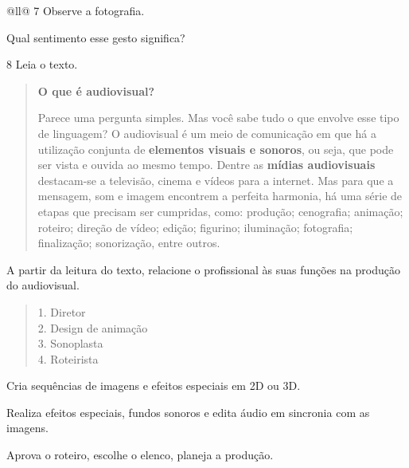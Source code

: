 \begin{itemize}
\begin{itemize}
\begin{escolha}[]{@{}ll@{}}
\num{7} Observe a fotografia.


Qual sentimento esse gesto significa?


\num{8} Leia o texto.

\begin{quote}
\textbf{O que é audiovisual?}

Parece uma pergunta simples. Mas você sabe tudo o que envolve esse tipo
de linguagem? O audiovisual é um meio de comunicação em que há a
utilização conjunta de \textbf{elementos visuais e sonoros}, ou seja,
que pode ser vista e ouvida ao mesmo tempo. Dentre as \textbf{mídias
audiovisuais} destacam-se a
televisão, cinema e vídeos
para a internet. Mas para que a mensagem, som e imagem encontrem a
perfeita harmonia, há uma série de etapas que precisam ser cumpridas,
como: produção; cenografia;
animação; roteiro;
direção de vídeo; edição; figurino; iluminação; fotografia; finalização;
sonorização, entre outros.

\end{quote}

A partir da leitura do texto, relacione o profissional às suas funções
na produção do audiovisual.

\begin{quote}
1. Diretor\\
2. Design de animação\\
3.  Sonoplasta\\
4. Roteirista
\end{quote}

\begin{boxlist}
\item Cria sequências de imagens e efeitos especiais em 2D ou 3D. 

\item Realiza efeitos especiais, fundos sonoros e edita áudio em sincronia com as imagens. 

\item Aprova o roteiro, escolhe o elenco, planeja a produção. 


\end{boxlist}
\end{escolha}
\end{itemize}
\end{itemize}
